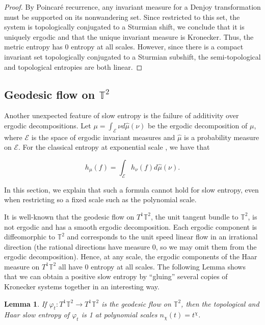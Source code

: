 \documentclass[oneside]{amsart}
\theoremstyle{plain}
\newtheorem{LEM}[THM]{Lemma}
\theoremstyle{definition}
\newcommand{\<}{\langle}
\renewcommand{\>}{\rangle}
\newcommand{\T}{\mathbb{T}}
\renewcommand{\|}{|\!|} %
\begin{document}
\begin{proof}
    By Poincar\'{e} recurrence, any invariant measure for a Denjoy transformation must be supported on its nonwandering set. Since restricted to this set, the system is topologically conjugated to a Sturmian shift, we conclude that it is uniquely ergodic and that the unique invariant measure is Kronecker. Thus, the metric entropy has 0 entropy at all scales. However, since there is a compact invariant set topologically conjugated to a Sturmian subshift, the semi-topological and topological entropies are both linear.
\end{proof}

\subsection{Geodesic flow on \texorpdfstring{$\mathbb{T}^2$}{}}
\label{sec:ergodic-decomp}

Another unexpected feature of slow entropy is the failure of additivity over ergodic decompositions. Let $\mu = \int_{\mathcal E} \nu d\hat{\mu}(\nu)$ be the ergodic decomposition of $\mu$, where $\mathcal E$ is the space of ergodic invariant measures and $\hat{\mu}$ is a probability measure on $\mathcal E$. For the classical entropy at exponential scale \cite[Theorem 9.6.2]{Viana_Oliveira_2016}, we have that

\begin{equation}
\label{eq:ergodic-decomp}
    h_\mu(f) = \int_{\mathcal E} h_\nu(f) d\hat{\mu}(\nu).
\end{equation} 

In this section, we explain that such a formula cannot hold for slow entropy, even when restricting so a fixed scale such as the polynomial scale.

It is well-known that the geodesic flow on $T^1\T^2$, the unit tangent bundle to $\T^2$, is not ergodic and has a smooth ergodic decomposition. Each ergodic component is diffeomorphic to $\T^2$ and corresponds to the unit speed linear flow in an irrational direction (the rational directions have measure 0, so we may omit them from the ergodic decomposition). Hence, at any scale, the ergodic components of the Haar measure on $T^1\T^2$ all have 0 entropy at all scales. The following Lemma shows that we can obtain a positive slow entropy by ``gluing'' several copies of Kronecker systems together in an interesting way.

\begin{LEM}
    \label{lemm:HaarGeod}
    If $\varphi_t : T^1\mathbb{T}^2 \to T^1\mathbb{T}^2$ is the geodesic flow on $\T^2$, then the topological and Haar slow entropy of $\varphi_t$ is 1 at polynomial scales $n_\chi(t) = t^\chi$.
\end{LEM}
\end{document}
